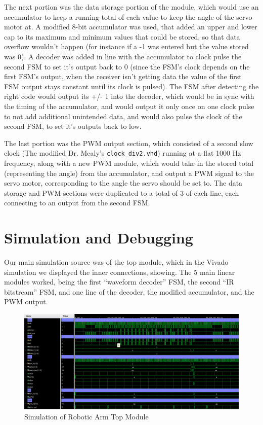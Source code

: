 \documentclass[
    a4paper, %
	12pt, %
    ]{CSSullivanBusinessReport}
\begin{document}
    The next portion was the data storage portion of the module, which would use an accumulator to keep a running total of each value to keep the angle of the servo motor at. A modified 8-bit accumulator was used, that added an upper and lower cap to its maximum and minimum values that could be stored, so that data overflow wouldn't happen (for instance if a -1 was entered but the value stored was 0). A decoder was added in line with the accumulator to clock pulse the second FSM to set it’s output back to 0 (since the FSM’s clock depends on the first FSM’s output, when the receiver isn’t getting data the value of the first FSM output stays constant until its clock is pulsed). The FSM after detecting the right code would output its +/- 1 into the decoder, which would be in sync with the timing of the accumulator, and would output it only once on one clock pulse to not add additional unintended data, and would also pulse the clock of the second FSM, to set it’s outputs back to low.
    
    The last portion was the PWM output section, which consisted of a second slow clock (The modified Dr. Mealy’s \verb|clock_div2.vhd|) running at a flat 1000 Hz frequency, along with a new PWM module, which would take in the stored total (representing the angle) from the accumulator, and output a PWM signal to the servo motor, corresponding to the angle the servo should be set to. The data storage and PWM sections were duplicated to a total of 3 of each line, each connecting to an output from the second FSM.


\section{Simulation and Debugging}

Our main simulation source was of the top module, which in the Vivado simulation we displayed the inner connections, showing. The 5 main linear modules worked, being the first “waveform decoder” FSM, the second “IR bitstream” FSM, and one line of the decoder, the modified accumulator, and the PWM output.

\begin{figure}[h]
    \centering
    \includegraphics[width=.8\pdfpagewidth]{Figures/Final Simulation.png}
    \caption{Simulation of Robotic Arm Top Module}
    \label{fig:lowlevelblockdiagram}
\end{figure}
\end{document}
